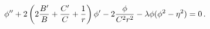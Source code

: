 \begin{equation}
\phi'' + 2\left( 2{B'\over B} +{C'\over C}+{1\over r}\right)\phi'
-2{\phi \over C^2r^2} -\lambda\phi (\phi^2-\eta^2) =0\,.
\label{eq=phi}
\end{equation}

